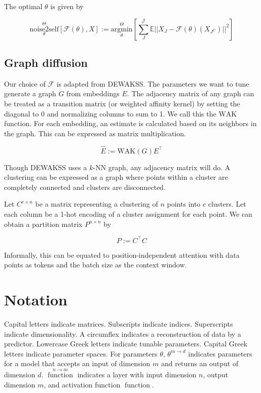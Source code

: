\documentclass{article}
\newcommand{\txtop}[1]{\mathop{\mathrm{#1}}\limits}
\newcommand{\function}{\txtop{function}}
\begin{document}
  The optimal $\theta$ is given by

\begin{equation}
  \underset{\theta}{\overset{\Theta}{\mathrm{noise2self}}}[\mathcal{F}(\theta),X] := \underset{\theta}{\overset{\Theta}{\mathrm{argmin}}}[\sum_{J}^{\mathcal{J}}\mathbb{E}||X_J-\mathcal{F}(\theta)(X_{J^C})||^2]
\end{equation}



\subsection{Graph diffusion}

Our choice of $\mathcal{F}$ is adapted from DEWAKSS\cite{tjarnberg2021}. The parameters we want to tune generate a graph $G$ from embeddings $E$. The adjacency matrix of any graph can be treated as a transition matrix (or weighted affinity kernel) by setting the diagonal to 0 and normalizing columns to sum to 1. We call this the $\mathrm{WAK}$ function. For each embedding, an estimate is calculated based on its neighbors in the graph. This can be expressed as matrix multiplication.

\begin{equation}
\hat{E} := \mathrm{WAK}(G)E^\top
\end{equation}

Though DEWAKSS uses a $k$-NN graph, any adjacency matrix will do.
A clustering can be expressed as a graph where points within a cluster are completely connected and clusters are disconnected.

Let $C^{c \times n}$ be a matrix representing a clustering of $n$ points into $c$ clusters. Let each column be a 1-hot encoding of a cluster assignment for each point. We can obtain a partition matrix $P^{n \times n}$ by

\begin{equation}
  P := C^\top C
\end{equation}

Informally, this can be equated to position-independent attention with data points as tokens and the batch size as the context window.

\section{Notation}
Capital letters indicate matrices. Subscripts indicate indices. Superscripts indicate dimensionality. A circumflex indicates a reconstruction of data by a predictor. Lowercase Greek letters indicate tunable parameters. Capital Greek letters indicate parameter spaces. For parameters $\theta$, $\theta^{m \to d}$ indicates parameters for a model that accepts an input of dimension $m$ and returns an output of dimension $d$. $\function^{n \to m}$ indicates a layer with input dimension $n$, output dimension $m$, and activation function $\function$.
\end{document}
